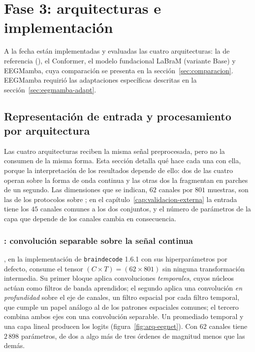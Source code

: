 \section{Fase 3: arquitecturas e implementación}
\label{sec:fase3}

A la fecha están implementadas y evaluadas las cuatro arquitecturas: la de
referencia (\eegnet{}), el Conformer, el modelo fundacional LaBraM (variante Base) y
EEGMamba, cuya comparación se presenta en la sección~\ref{sec:comparacion}. EEGMamba
requirió las adaptaciones específicas descritas en la
sección~\ref{sec:eegmamba-adapt}.

\subsection{Representación de entrada y procesamiento por arquitectura}
\label{sec:representaciones}

Las cuatro arquitecturas reciben la misma señal preprocesada, pero no la consumen de la
misma forma. Esta sección detalla qué hace cada una con ella, porque la
interpretación de los resultados depende de ello: dos de las cuatro operan sobre la forma
de onda continua y las otras dos la fragmentan en parches de un segundo. Las dimensiones que
se indican, $62$ canales por $801$ muestras, son las de los protocolos sobre \openbmi{}; en
el capítulo~\ref{cap:validacion-externa} la entrada tiene los $45$ canales comunes a los
dos conjuntos, y el número de parámetros de la capa que depende de los canales cambia en
consecuencia.

\subsubsection{\eegnet{}: convolución separable sobre la señal continua}

\eegnet{} \cite{lawhern2018}, en la implementación de \texttt{braindecode} 1.6.1
\cite{schirrmeister2017} con sus hiperparámetros por defecto, consume el tensor $(C \times T) = (62 \times 801)$ sin ninguna transformación intermedia.
Su primer bloque aplica convoluciones \emph{temporales}, cuyos núcleos actúan como filtros
de banda aprendidos; el segundo aplica una convolución \emph{en profundidad} sobre el eje
de canales, un filtro espacial por cada filtro temporal, que cumple un papel análogo al de
los patrones espaciales comunes; el tercero combina ambos ejes con una convolución
separable. Un promediado temporal y una capa lineal producen los logits
(figura~\ref{fig:arq-eegnet}). Con $62$ canales
tiene $2\,898$ parámetros, de dos a algo más de tres órdenes de magnitud menos que las demás.

